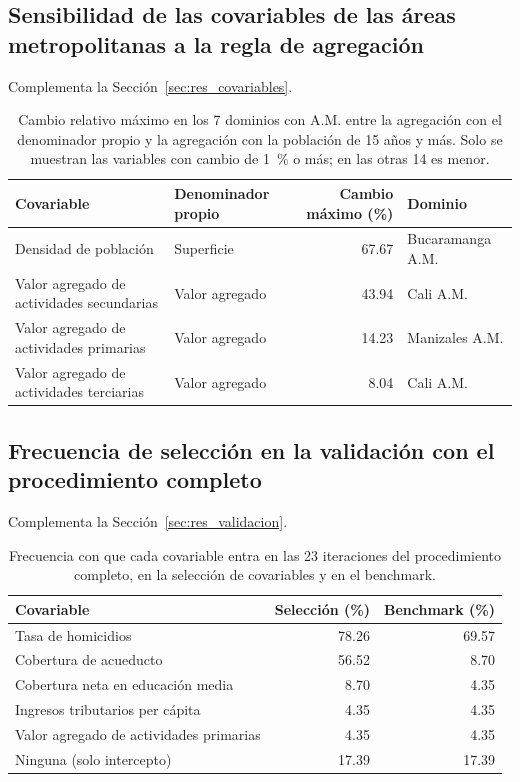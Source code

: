\subsection{Sensibilidad de las covariables de las áreas metropolitanas a la regla de agregación}

Complementa la Sección~\ref{sec:res_covariables}.

\begin{table}[!htbp]
\centering
\small
\caption{Cambio relativo máximo en los 7 dominios con A.M. entre la agregación con el denominador propio y la agregación con la población de 15 años y más. Solo se muestran las variables con cambio de 1~\% o más; en las otras 14 es menor.}
\label{tab:res_agregacion_am}
\begin{tabular}{l l r l}
\toprule
Covariable & Denominador propio & Cambio máximo (\%) & Dominio \\
\midrule
Densidad de población & Superficie & 67.67 & Bucaramanga A.M. \\
Valor agregado de actividades secundarias & Valor agregado & 43.94 & Cali A.M. \\
Valor agregado de actividades primarias & Valor agregado & 14.23 & Manizales A.M. \\
Valor agregado de actividades terciarias & Valor agregado & 8.04 & Cali A.M. \\
\bottomrule
\end{tabular}
\end{table}

\subsection{Frecuencia de selección en la validación con el procedimiento completo}

Complementa la Sección~\ref{sec:res_validacion}.

\begin{table}[!htbp]
\centering
\small
\caption{Frecuencia con que cada covariable entra en las 23 iteraciones del procedimiento completo, en la selección de covariables y en el benchmark.}
\label{tab:res_frecuencia}
\begin{tabular}{l r r}
\toprule
Covariable & Selección (\%) & Benchmark (\%) \\
\midrule
Tasa de homicidios & 78.26 & 69.57 \\
Cobertura de acueducto & 56.52 & 8.70 \\
Cobertura neta en educación media & 8.70 & 4.35 \\
Ingresos tributarios per cápita & 4.35 & 4.35 \\
Valor agregado de actividades primarias & 4.35 & 4.35 \\
Ninguna (solo intercepto) & 17.39 & 17.39 \\
\bottomrule
\end{tabular}
\end{table}

